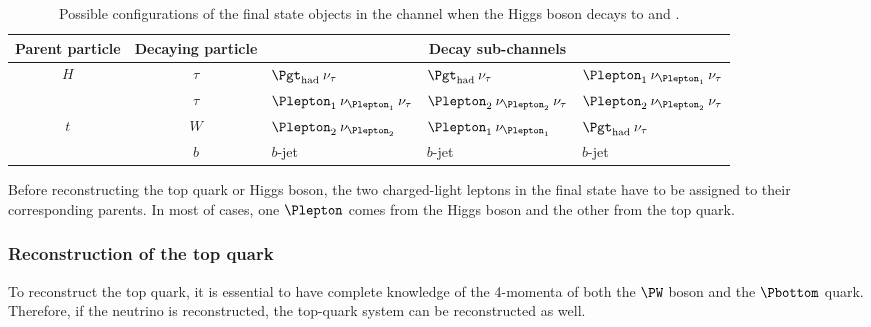 \begin{table}[h]
\centering
\begin{tabular}{c|c|l|l|l}
\toprule
 Parent particle & Decaying particle & \multicolumn{3}{c}{Decay sub-channels} \\ \midrule
 $H$ & $\tau$ & $\tauhad \: \nu_{\tau}$           &  $\tauhad \: \nu_{\tau}$           & $\Plepton_1 \: \nu_{\Plepton_1} \: \nu_{\tau}$ \\ 
     & $\tau$ & $\Plepton_1 \: \nu_{\Plepton_1} \: \nu_{\tau}$ &  $\Plepton_2 \: \nu_{\Plepton_2} \: \nu_{\tau}$ & $\Plepton_2 \: \nu_{\Plepton_2} \: \nu_{\tau}$ \\ \midrule
 $t$ &  $W$   & $\Plepton_2 \: \nu_{\Plepton_2}$               &  $\Plepton_1 \: \nu_{\Plepton_1}$               &  $\tauhad \: \nu_{\tau}$          \\ %
     &  $b$   &  $b$-jet                         &  $b$-jet                          & $b$-jet                          \\ \bottomrule
\end{tabular}
\caption{Possible configurations of the final state objects in the \dileptau channel when the Higgs boson decays
to \tauhad and \taulep.} %
\label{tab:ChaptH:Reconstruction:Configurations}
\end{table}



Before reconstructing the top quark or Higgs boson, the two charged-light leptons in the final state have to be
assigned to their corresponding parents. In most of cases, one $\Plepton$ comes from the Higgs boson and the other 
from the top quark. %

\subsubsection{Reconstruction of the top quark}
\label{sec:ChaptH:Sig:EventReconstruction:top}
To reconstruct the top quark, it is essential to have complete knowledge of the 4-momenta of both 
the $\PW$ boson and the $\Pbottom$ quark. %
Therefore, if the neutrino is reconstructed, the top-quark system can be reconstructed as well. 

